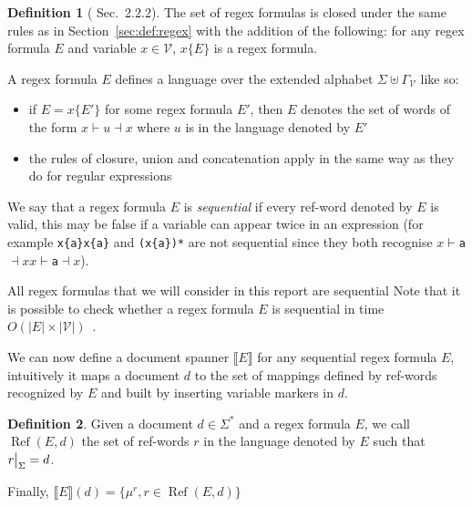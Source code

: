 \documentclass[12px]{article}
\theoremstyle{definition}
\newtheorem{definition}{Definition}
\DeclareMathOperator{\Ref}{Ref}
\newcommand\restr[2]{{%
  \left.\kern-\nulldelimiterspace %
  #1 %
  \vphantom{\big|} %
  \right|_{#2} %
  }}
\begin{document}
        \begin{definition}[\cite{peterfreund} Sec.\ 2.2.2]
          The set of regex formulas is closed under the same rules as in
          Section~\ref{sec:def:regex} with the addition of the following: for
          any regex formula $E$ and variable $x \in \mathcal{V}$, $x\{E\}$ is a
          regex formula.

          A regex formula $E$ defines a language over the extended alphabet
          $\Sigma \uplus \Gamma_\mathcal{V}$ like so:
            \begin{itemize}
              \item if $E = x\{E'\}$ for some regex formula $E'$, then $E$ denotes
                the set of words of the form $x{\vdash} u {\dashv}x$ where $u$ is
                in the language denoted by $E'$
              \item the rules of closure, union and concatenation apply in the same
                way as they do for regular expressions
            \end{itemize}

          We say that a regex formula $E$ is \textit{sequential} if every
          ref-word denoted by $E$ is valid, this may be false if a variable can
          appear twice in an expression (for example \texttt{x\{a\}x\{a\}} and
          \texttt{(x\{a\})*} are not sequential since they both recognise
          \texttt{$x{\vdash}$a${\dashv}x$$x{\vdash}$a${\dashv}x$}).
        \end{definition}

        All regex formulas that we will consider in this report are sequential
        Note that it is possible to check whether a regex formula $E$ is
        sequential in time $O(|E| \times |\mathcal{V}|)$~\cite{peterfreund}.

        We can now define a document spanner $\llbracket E \rrbracket$ for any
        sequential regex formula $E$, intuitively it maps a document $d$ to the
        set of mappings defined by ref-words recognized by $E$ and built by
        inserting variable markers in $d$.

        \begin{definition}
          Given a document $d \in \Sigma^*$ and a regex formula $E$, we call
          $\Ref(E, d)$ the set of ref-words $r$ in the language denoted by $E$
          such that $\restr{r}{\Sigma} = d$.

          Finally, $\llbracket E \rrbracket (d) = \{\mu^r, r \in \Ref(E, d)\}$
        \end{definition}
\end{document}
